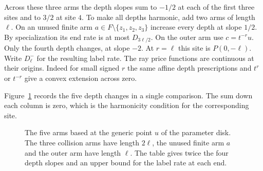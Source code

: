 Across these three arms the depth slopes sum to \(-1/2\) at each of
the first three sites and to \(3/2\) at site \(4\). To make all depths
harmonic, add two arms of length \(\ell\). On an unused finite arm
\(a\in F\setminus\{z_1,z_2,z_3\}\) increase every depth at slope
\(1/2\). By specialization its end rate is at most \(D_{3\ell/2}\).
On the outer arm use \(c=t^{-r}u\). Only the fourth depth changes, at
slope \(-2\). At \(r=\ell\) this site is \(P(0,-\ell)\). Write
\(D_\ell^-\) for the resulting label rate.
The ray price functions are continuous at their origins. Indeed for
small signed \(r\) the same affine depth prescriptions and \(t^r\) or
\(t^{-r}\) give a convex extension across zero.

Figure~\ref{fig:harmonic} records the five depth changes in a single
comparison. The sum down each column is zero, which is the harmonicity
condition for the corresponding site.

\begin{figure}[htb]
\centering
{}
\caption{The five arms based at the generic point \(u\) of the
parameter disk. The three collision arms have length \(2\ell\), the
unused finite arm \(a\) and the outer arm have length \(\ell\). The
table gives twice the four depth slopes and an upper bound for the
label rate at each end.}
\label{fig:harmonic}
\end{figure}


